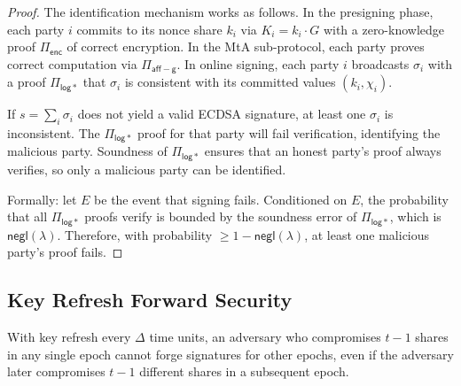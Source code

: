 \begin{proof}
The identification mechanism works as follows. In the presigning phase, each party $i$
commits to its nonce share $k_i$ via $K_i = k_i \cdot G$ with a zero-knowledge proof
$\Pi_{\mathsf{enc}}$ of correct encryption. In the MtA sub-protocol, each party proves
correct computation via $\Pi_{\mathsf{aff-g}}$. In online signing, each party $i$
broadcasts $\sigma_i$ with a proof $\Pi_{\mathsf{log*}}$ that $\sigma_i$ is consistent
with its committed values $(k_i, \chi_i)$.

If $s = \sum_i \sigma_i$ does not yield a valid ECDSA signature, at least one $\sigma_i$
is inconsistent. The $\Pi_{\mathsf{log*}}$ proof for that party will fail verification,
identifying the malicious party. Soundness of $\Pi_{\mathsf{log*}}$ ensures that an
honest party's proof always verifies, so only a malicious party can be identified.

Formally: let $E$ be the event that signing fails. Conditioned on $E$, the probability
that all $\Pi_{\mathsf{log*}}$ proofs verify is bounded by the soundness error of
$\Pi_{\mathsf{log*}}$, which is $\mathsf{negl}(\lambda)$. Therefore, with probability
$\geq 1 - \mathsf{negl}(\lambda)$, at least one malicious party's proof fails.
\end{proof}

\subsection{Key Refresh Forward Security}

\begin{theorem}
\label{thm:forward}
With key refresh every $\Delta$ time units, an adversary who compromises $t-1$ shares
in any single epoch cannot forge signatures for other epochs, even if the adversary
later compromises $t-1$ different shares in a subsequent epoch.
\end{theorem}

